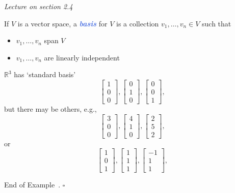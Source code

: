 \documentclass[10pt]{article}
\newcommand{\demph}[1]{\textcolor{RoyalBlue}{\textbf{\slshape #1}}} %
\theoremstyle{definition}
\newtheorem{example}[theorem]{Example}
\renewenvironment{example}
{\begin{oldexample}}
  {\par\smallskip\hfill   End of Example~\theexample. $\square$    \par\end{oldexample}}
\newcommand{\R}{\mathbb{R}}           %
\begin{document}
\textit{Lecture on section 2.4}

If $V$ is a vector space, a \demph{basis} for $V$ is a collection
$v_{1},\ldots,v_{n}\in V$ such that
\begin{itemize}
  \item  $v_{1},\ldots,v_{n}$ span $V$
  \item $v_{1},\ldots,v_{n}$ are linearly independent
\end{itemize}

\begin{example}[Bases]
  $\R^{3}$ has `standard basis'
  \begin{equation*}
    \begin{bmatrix}
      1\\0\\0
    \end{bmatrix},
    \begin{bmatrix}
      0\\1\\0
    \end{bmatrix},
    \begin{bmatrix}
      0\\0\\1
    \end{bmatrix},
  \end{equation*}
  but there may be others, e.g.,
  \begin{equation*}
    \begin{bmatrix}
      3\\0\\0
    \end{bmatrix},
    \begin{bmatrix}
      4\\1\\0
    \end{bmatrix},
    \begin{bmatrix}
      2\\5\\2
    \end{bmatrix},
  \end{equation*}
  or
  \begin{equation*}
    \begin{bmatrix}
      1\\0\\1
    \end{bmatrix},
    \begin{bmatrix}
      1\\1\\1
    \end{bmatrix},
    \begin{bmatrix}
      -1\\1\\1
    \end{bmatrix},
  \end{equation*}
\end{example}
\end{document}
